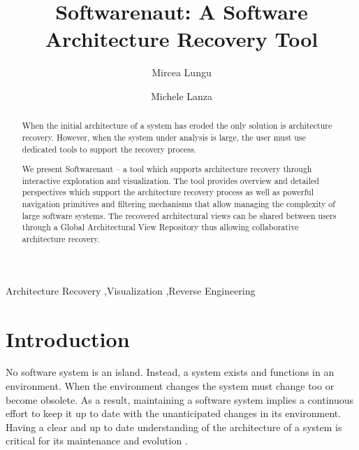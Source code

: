 \documentclass[preprint,12pt]{elsarticle}
\begin{document}
\begin{frontmatter}


\title{Softwarenaut: A Software Architecture Recovery Tool}

\author{Mircea Lungu}
\address{Software Composition Group - University of Bern, Switzerland}

\author{Michele Lanza}
\address{REVEAL @ Faculty of Informatics - University of Lugano, Switzerland}


\begin{abstract}

When the initial architecture of a system has eroded the only solution is architecture recovery. However, when the system under analysis is large, the user must use dedicated tools to support the recovery process. 

We present Softwarenaut -- a tool which supports architecture recovery through interactive exploration and visualization. The tool provides overview and detailed perspectives which support the architecture recovery process as well as powerful navigation primitives and filtering mechanisms that allow managing the complexity of large software systems. The recovered architectural views can be shared between users through a Global Architectural View Repository thus allowing collaborative architecture recovery.

\end{abstract}

\begin{keyword}
Architecture Recovery \sep Visualization \sep Reverse Engineering
\end{keyword}

\end{frontmatter}

\section{Introduction} \label{sec:Introduction}

No software system is an island. Instead, a system exists and functions in an environment. When the environment changes the system must change too or become obsolete\cite{lehman-softev}. As a result, maintaining a software system implies a continuous effort to keep it up to date with the unanticipated changes in its environment. Having a clear and up to date understanding of the architecture of a system is critical for its maintenance and evolution \cite{Duca09c, pollet-sar}.
\end{document}
